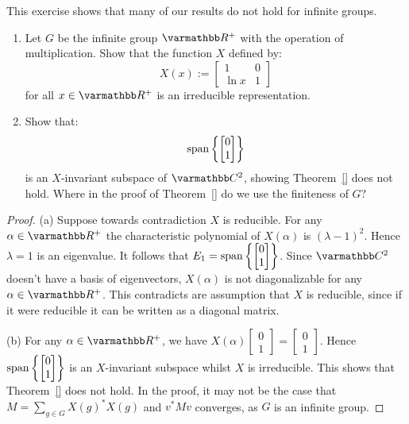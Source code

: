 \begin{exercise}
	This exercise shows that many of our results do not hold for infinite groups.
	\mbox{}
	\begin{enumerate}[label = (\alph*),itemsep=1pt,topsep=3pt]
		\item Let $G$ be the infinite group $\bfR^+$ with the operation of multiplication. Show that the function $X$ defined by:
			\[
				X(x) := \begin{bmatrix} 1 & 0 \\ \ln x & 1 \end{bmatrix} 
			\] 
			for all $x \in \bfR^+$ is an irreducible representation.
		\item Show that:
			\[
				\operatorname{span} \left\{ \begin{bmatrix} 0 \\ 1 \end{bmatrix}  \right\}  
			\] 
			is an $X$-invariant subspace of $\bfC^2$, showing Theorem~\ref{} does not hold. Where in the proof of Theorem~\ref{} do we use the finiteness of $G?$
	\end{enumerate}
\end{exercise}
	\begin{proof}
		(a) Suppose towards contradiction $X$ is reducible. For any $\alpha \in \bfR^+$ the characteristic polynomial of $X(\alpha)$ is $(\lambda-1)^2$. Hence $\lambda = 1$ is an eigenvalue. It follows that $E_1 = \operatorname{span} \left\{ \begin{bmatrix} 0 \\ 1 \end{bmatrix}  \right\} $. Since $\bfC^2$ doesn't have a basis of eigenvectors, $X(\alpha)$ is not diagonalizable for any $\alpha \in \bfR^+$. This contradicts are assumption that $X$ is reducible, since if it were reducible it can be written as a diagonal matrix.

		(b) For any $\alpha \in \bfR^+$, we have $X(\alpha)\begin{bmatrix} 0 \\ 1 \end{bmatrix}  = \begin{bmatrix} 0 \\ 1 \end{bmatrix} $. Hence $\operatorname{span} \left\{ \begin{bmatrix} 0 \\ 1 \end{bmatrix}  \right\} $ is an $X$-invariant subspace whilst $X$ is irreducible. This shows that Theorem~\ref{} does not hold. In the proof, it may not be the case that $M = \sum_{g \in G}^{} X(g)^\ast X(g)$ and $v^\ast M v$ converges, as $G$ is an infinite group.
	\end{proof}

